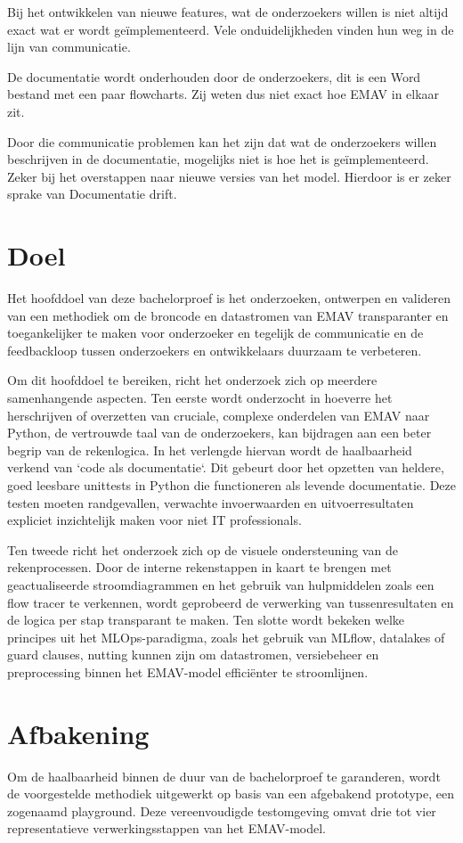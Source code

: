 Bij het ontwikkelen van nieuwe features, wat de onderzoekers willen is niet altijd exact wat er wordt ge\"{i}mplementeerd.
Vele onduidelijkheden vinden hun weg in de lijn van communicatie.

De documentatie wordt onderhouden door de onderzoekers, dit is een Word bestand met een paar flowcharts.
Zij weten dus niet exact hoe EMAV in elkaar zit.

Door die communicatie problemen kan het zijn dat wat de onderzoekers willen beschrijven in de documentatie, mogelijks niet is hoe het is ge\"{i}mplementeerd.
Zeker bij het overstappen naar nieuwe versies van het model.
Hierdoor is er zeker sprake van Documentatie drift.


\section{Doel}
Het hoofddoel van deze bachelorproef is het onderzoeken, ontwerpen en valideren van een methodiek om de broncode en datastromen van EMAV transparanter en toegankelijker te maken voor onderzoeker en tegelijk de communicatie en de feedbackloop tussen onderzoekers en ontwikkelaars duurzaam te  verbeteren.

Om dit hoofddoel te bereiken, richt het onderzoek zich op meerdere samenhangende aspecten.
Ten eerste wordt onderzocht in hoeverre het herschrijven of overzetten van cruciale, complexe onderdelen van EMAV naar Python, de vertrouwde taal van de onderzoekers, kan bijdragen aan een beter begrip van de rekenlogica.
In het verlengde hiervan wordt de haalbaarheid verkend van `code als documentatie`.
Dit gebeurt door het opzetten van heldere, goed leesbare unittests in Python die functioneren als levende documentatie.
Deze testen moeten randgevallen, verwachte invoerwaarden en uitvoerresultaten expliciet inzichtelijk maken voor niet IT professionals.

Ten tweede richt het onderzoek zich op de visuele ondersteuning van de rekenprocessen.
Door de interne rekenstappen in kaart te brengen met geactualiseerde stroomdiagrammen en het gebruik van hulpmiddelen zoals een flow tracer te verkennen, wordt geprobeerd de verwerking van tussenresultaten en de logica per stap transparant te maken.
Ten slotte wordt bekeken welke principes uit het MLOps-paradigma, zoals het gebruik van MLflow, datalakes of guard clauses, nutting kunnen zijn om datastromen, versiebeheer en preprocessing binnen het EMAV-model effici\"{e}nter te stroomlijnen.

\section{Afbakening}
\label{sec:scope}
Om de haalbaarheid binnen de duur van de bachelorproef te garanderen, wordt de voorgestelde methodiek uitgewerkt op basis van een afgebakend prototype, een zogenaamd playground.
Deze vereenvoudigde testomgeving omvat drie tot vier representatieve verwerkingsstappen van het EMAV-model.

